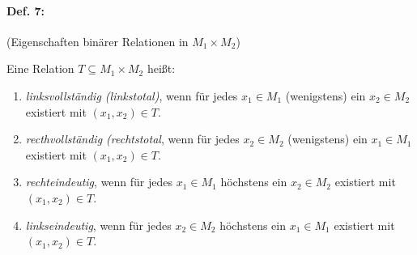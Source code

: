 \paragraph{Def. 7:}\label{Def. 7} (Eigenschaften binärer Relationen in $M_1\times M_2$)

Eine Relation $T\subseteq M_1\times M_2$ heißt:
\begin{enumerate}[label=\alph*)]
\item \emph{linksvollständig (linkstotal)}, wenn für jedes $x_1 \in M_1$ (wenigstens) ein $x_2 \in M_2$ existiert mit $(x_1, x_2) \in T$.
\item \emph{recthvollständig (rechtstotal}, wenn für jedes $x_2 \in M_2$ (wenigstens) ein $x_1 \in M_1$ existiert mit $(x_1,x_2) \in T$.
\item \emph{rechteindeutig}, wenn für jedes $x_1 \in M_1$ höchstens ein $x_2 \in M_2$ existiert mit $(x_1, x_2) \in T$.
\item \emph{linkseindeutig}, wenn für jedes $x_2 \in M_2$ höchstens ein $x_1 \in M_1$ existiert mit $(x_1, x_2) \in T$.
\end{enumerate}

